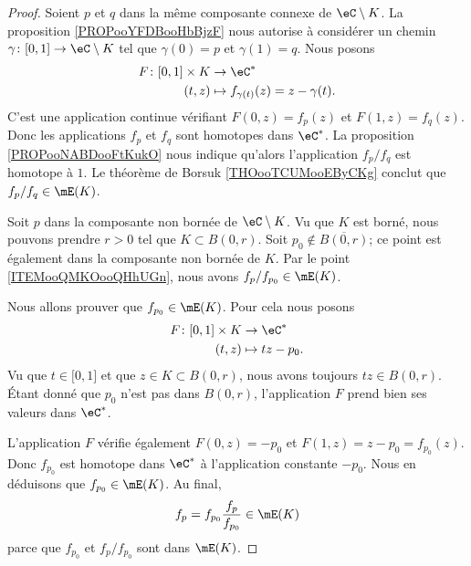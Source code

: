 \begin{proof}
	Soient \( p\) et \( q\) dans la même composante connexe de \( \eC\setminus K\). La proposition \ref{PROPooYFDBooHbBjzF} nous autorise à considérer un chemin \( \gamma\colon \mathopen[ 0 , 1 \mathclose]\to \eC\setminus K\) tel que \( \gamma(0)=p\) et \( \gamma(1)=q\). Nous posons
	\begin{equation}
		\begin{aligned}
			F\colon \mathopen[ 0 , 1 \mathclose]\times K & \to \eC^*                             \\
			(t,z)                                        & \mapsto f_{\gamma(t)}(z)=z-\gamma(t).
		\end{aligned}
	\end{equation}
	C'est une application continue vérifiant \( F(0,z)=f_p(z)\) et \( F(1,z)=f_q(z)\). Donc les applications \( f_p\) et \( f_q\) sont homotopes dans \( \eC^*\). La proposition \ref{PROPooNABDooFtKukO} nous indique qu'alors l'application \( f_p/f_q\) est homotope à \( 1\). Le théorème de Borsuk \ref{THOooTCUMooEByCKg} conclut que \( f_p/f_q\in\mE(K)\).

	Soit \( p\) dans la composante non bornée de \( \eC\setminus K\). Vu que \( K\) est borné, nous pouvons prendre \( r>0\) tel que \( K\subset B(0,r)\). Soit \( p_0\notin \overline{ B(0,r) }\); ce point est également dans la composante non bornée de \( K\). Par le point \ref{ITEMooQMKOooQHhUGn}, nous avons \( f_p/f_{p_0}\in\mE(K)\).

	Nous allons prouver que \( f_{p_0}\in \mE(K)\). Pour cela nous posons
	\begin{equation}
		\begin{aligned}
			F\colon \mathopen[ 0 , 1 \mathclose]\times K & \to \eC^*       \\
			(t,z)                                        & \mapsto tz-p_0.
		\end{aligned}
	\end{equation}
	Vu que \( t\in \mathopen[ 0 , 1 \mathclose]\) et que \( z\in K\subset B(0,r)\), nous avons toujours \( tz\in B(0,r)\). Étant donné que \( p_0\) n'est pas dans \( B(0,r)\), l'application \( F\) prend bien ses valeurs dans \( \eC^*\).

	L'application \( F\) vérifie également \( F(0,z)=-p_0\) et \( F(1,z)=z-p_0=f_{p_0}(z)\). Donc \( f_{p_0}\) est homotope dans \( \eC^*\) à l'application constante \( -p_0\). Nous en déduisons que \( f_{p_0}\in\mE(K)\). Au final,
	\begin{equation}
		f_p=f_{p_0}\frac{ f_p }{ f_{p_0} }\in \mE(K)
	\end{equation}
	parce que \( f_{p_0}\) et \( f_p/f_{p_0}\) sont dans \( \mE(K)\).
\end{proof}

